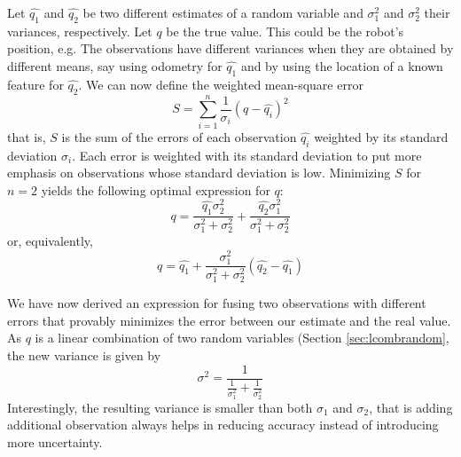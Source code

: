  Let $ \hat{q_1}$ and $ \hat{q_2}$ be two different estimates of a random variable and $ \sigma^2_1$ and $ \sigma^2_2$ their variances, respectively. Let $ q$ be the true value. This could be the robot's position, e.g. The observations have different variances when they are obtained by  different means, say using odometry for $ \hat{q_1}$ and by using the location of a known feature for $ \hat{q_2}$. We can now define the weighted mean-square error
 \begin{equation}
S=\displaystyle\sum_{i=1}^{n}\frac{1}{\sigma_i} (q-\hat{q_i})^2
\end{equation}
that is, $ S$ is the sum of the errors of each observation $ \hat{q_i}$ weighted by its standard deviation $ \sigma_i$. Each error is weighted  with its standard deviation to put more emphasis on observations whose standard deviation is low. Minimizing  $S$ for $n=2$ yields the following optimal expression for $q$:
\begin{equation}
q=\frac{\hat{q_1}\sigma_2^2}{\sigma_1^2+\sigma_2^2}+\frac{\hat{q_2}\sigma_1^2}{\sigma_1^2+\sigma_2^2}
\end{equation}
or, equivalently, 
\begin{equation}
q=\hat{q_1}+\frac{\sigma_1^2}{\sigma_1^2+\sigma_2^2}(\hat{q_2}-\hat{q_1})\label{eq:optimalfusion}
\end{equation}

We have now derived an expression for fusing two observations with different errors that provably minimizes the error between our estimate and the real value. As $q$ is a linear combination of two random variables (Section \ref{sec:lcombrandom}, the new variance is given by
\begin{equation}
\sigma^2=\frac{1}{\frac{1}{\sigma_1^2}+\frac{1}{\sigma_2^2}}
\end{equation}
Interestingly, the resulting variance is smaller than both $\sigma_1$ and $\sigma_2$, that is adding additional observation always helps in reducing accuracy instead of introducing more uncertainty. 

